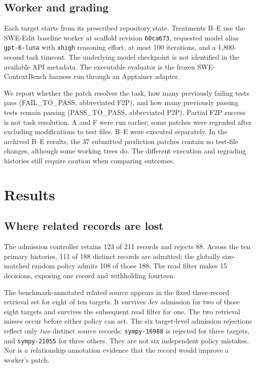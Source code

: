\documentclass[sigconf,anonymous]{aamas}
\begin{document}
\subsection{Worker and grading}
Each target starts from its prescribed repository state. Treatments B--E use the SWE-Edit baseline worker at scaffold revision \texttt{60ca673}, requested model alias \texttt{gpt-6-luna} with \texttt{xhigh} reasoning effort, at most 100 iterations, and a 1,800-second task timeout. The underlying model checkpoint is not identified in the available API metadata. The executable evaluator is the frozen SWE-ContextBench harness run through an Apptainer adapter.

We report whether the patch resolves the task, how many previously failing tests pass (FAIL\_TO\_PASS, abbreviated F2P), and how many previously passing tests remain passing (PASS\_TO\_PASS, abbreviated P2P). Partial F2P success is not task resolution. A and F were run earlier; some patches were regraded after excluding modifications to test files. B--E were executed separately. In the archived B--E results, the 37 submitted prediction patches contain no test-file changes, although some working trees do. The different execution and regrading histories still require caution when comparing outcomes.

\section{Results}
\subsection{Where related records are lost}
The admission controller retains 123 of 211 records and rejects 88. Across the ten primary histories, 111 of 188 distinct records are admitted; the globally size-matched random policy admits 108 of those 188. The read filter makes 15 decisions, exposing one record and withholding fourteen.

The benchmark-annotated related source appears in the fixed three-record retrieval set for eight of ten targets. It survives Jev admission for two of those eight targets and survives the subsequent read filter for one. The two retrieval misses occur before either policy can act. The six target-level admission rejections reflect only \emph{two} distinct source records: \texttt{sympy-16988} is rejected for three targets, and \texttt{sympy-21055} for three others. They are not six independent policy mistakes. Nor is a relationship annotation evidence that the record would improve a worker's patch.
\end{document}
